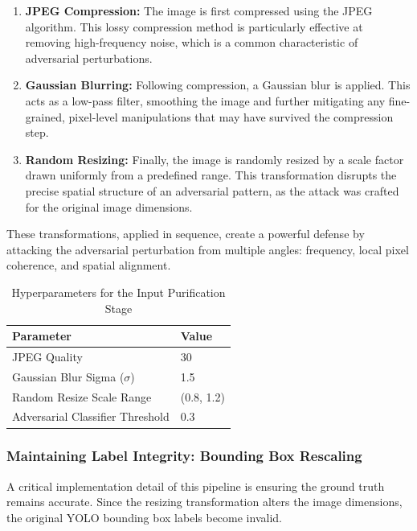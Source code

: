 \documentclass[../main.tex]{subfiles}
\begin{document}
\begin{enumerate}
    \item \textbf{JPEG Compression:} The image is first compressed using the JPEG algorithm. This lossy compression method is particularly effective at removing high-frequency noise, which is a common characteristic of adversarial perturbations.
    
    \item \textbf{Gaussian Blurring:} Following compression, a Gaussian blur is applied. This acts as a low-pass filter, smoothing the image and further mitigating any fine-grained, pixel-level manipulations that may have survived the compression step.
    
    \item \textbf{Random Resizing:} Finally, the image is randomly resized by a scale factor drawn uniformly from a predefined range. This transformation disrupts the precise spatial structure of an adversarial pattern, as the attack was crafted for the original image dimensions.
\end{enumerate}


These transformations, applied in sequence, create a powerful defense by attacking the adversarial perturbation from multiple angles: frequency, local pixel coherence, and spatial alignment.

\begin{table}[h!]
    \centering
    \caption{Hyperparameters for the Input Purification Stage}
    \label{tab:pipeline_params}
    \begin{tabular}{ll}
        \toprule
        \textbf{Parameter} & \textbf{Value} \\
        \midrule
        JPEG Quality & 30 \\
        Gaussian Blur Sigma ($\sigma$) & 1.5 \\
        Random Resize Scale Range & (0.8, 1.2) \\
        Adversarial Classifier Threshold & 0.3 \\
        \bottomrule
    \end{tabular}
\end{table}

\subsubsection{Maintaining Label Integrity: Bounding Box Rescaling}
A critical implementation detail of this pipeline is ensuring the ground truth remains accurate. Since the resizing transformation alters the image dimensions, the original YOLO bounding box labels become invalid. 
\end{document}
